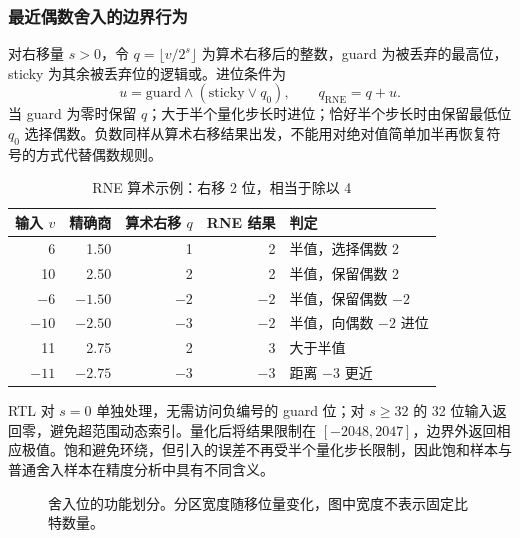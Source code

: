 \subsubsection{最近偶数舍入的边界行为}
对右移量 $s>0$，令 $q=\lfloor v/2^s\rfloor$ 为算术右移后的整数，guard 为被丢弃的最高位，sticky 为其余被丢弃位的逻辑或。进位条件为
\[
u=\mathrm{guard}\land(\mathrm{sticky}\lor q_0),\qquad q_{\mathrm{RNE}}=q+u.
\]
当 guard 为零时保留 $q$；大于半个量化步长时进位；恰好半个步长时由保留最低位 $q_0$ 选择偶数。负数同样从算术右移结果出发，不能用对绝对值简单加半再恢复符号的方式代替偶数规则。

\begin{table}[H]\centering\small
\caption{RNE 算术示例：右移 2 位，相当于除以 4}
\begin{tabular}{rrrrl}\toprule
输入 $v$ & 精确商 & 算术右移 $q$ & RNE 结果 & 判定\\\midrule
6 & 1.50 & 1 & 2 & 半值，选择偶数 2\\
10 & 2.50 & 2 & 2 & 半值，保留偶数 2\\
$-6$ & $-1.50$ & $-2$ & $-2$ & 半值，保留偶数 $-2$\\
$-10$ & $-2.50$ & $-3$ & $-2$ & 半值，向偶数 $-2$ 进位\\
11 & 2.75 & 2 & 3 & 大于半值\\
$-11$ & $-2.75$ & $-3$ & $-3$ & 距离 $-3$ 更近\\\bottomrule
\end{tabular}
\end{table}

RTL 对 $s=0$ 单独处理，无需访问负编号的 guard 位；对 $s\ge32$ 的 32 位输入返回零，避免超范围动态索引。量化后将结果限制在 $[-2048,2047]$，边界外返回相应极值。饱和避免环绕，但引入的误差不再受半个量化步长限制，因此饱和样本与普通舍入样本在精度分析中具有不同含义。

\begin{figure}[H]\centering
{}
\caption{舍入位的功能划分。分区宽度随移位量变化，图中宽度不表示固定比特数量。}
\end{figure}

